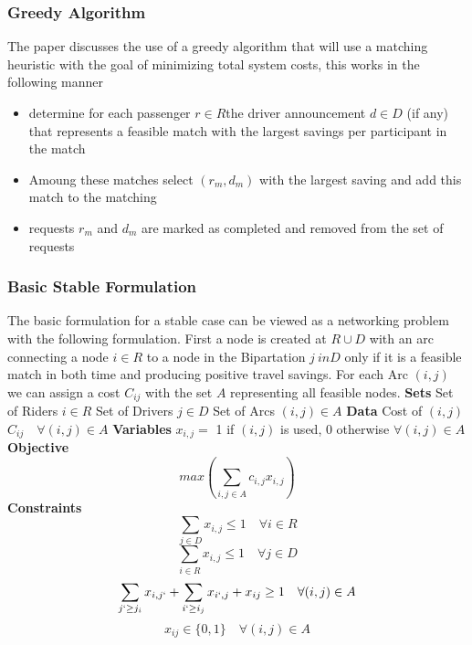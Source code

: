 \documentclass[]{report}
\begin{document}
\subsubsection*{Greedy Algorithm}
The paper discusses the use of a greedy algorithm that will use a matching heuristic with the goal of minimizing total system costs, this works in the following manner
\begin{itemize}
	\item determine for each passenger $r \in R$the driver announcement $d \in D$ (if any) that represents a feasible match with the largest savings per participant in the match
	\item Amoung these matches select $(r_m,d_m)$ with the largest saving and add this match to the matching 
	\item requests $r_m$ and $d_m$ are marked as completed and removed from the set of requests
\end{itemize}

\subsubsection*{Basic Stable Formulation}
The basic formulation for a stable case can be viewed as a networking problem with the following formulation. 
First a node is created at $R \cup D$  with an arc connecting a node $i \in R$ to a node in the Bipartation $j \ in D$ only if it is a feasible match in both time and producing positive travel savings. For each Arc $(i,j)$ we can assign a cost $C_{ij}$ with the set $A$ representing all feasible nodes.
\newline
\textbf{Sets}
\newline
Set of Riders $i \in R$
\newline
Set of Drivers $j \in D$
\newline
Set of Arcs $(i,j) \in A$
\newline 
\textbf{Data}
\newline
Cost of $(i,j)$ $C_{ij} \quad \forall (i,j) \in A$
\newline
\textbf{Variables}
\newline
\(x_{i,j} = \) 1 if $(i,j)$ is used, 0 otherwise $\forall (i,j) \in A$
\newline
\textbf{Objective}
\[max(\sum_{i,j \in A} c_{i,j}x_{i,j})\]
\newline
\textbf{Constraints}
\[\sum_{j \in D} x_{i,j} \leq 1 \quad \forall i \in R \]
\[\sum_{i \in R} x_{i,j} \leq 1 \quad \forall j \in D \]
\[\sum_{j` \geq j_i} x_{i,j`} +  \sum_{i` \geq i_j} x_{i`,j} + x_{ij}\geq 1 \quad \forall (i,j)\in A \]
\[x_{ij} \in \{0,1\} \quad \forall (i,j)\in A\]
\end{document}
